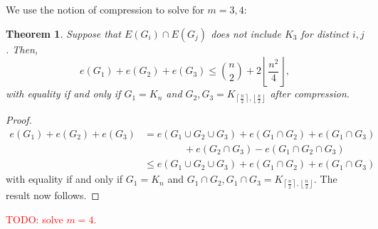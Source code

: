 \documentclass[a4paper]{article}
\newtheorem{theorem}{Theorem}[section]
\begin{document}
  We use the notion of compression to solve for $m = 3, 4$:
  \begin{theorem}
    Suppose that $E(G_i) \cap E(G_j)$ does not include $K_3$ for distinct $i, j$. Then,
    \[
      e(G_1) + e(G_2) + e(G_3) \leq \binom{n}{2} + 2\left\lfloor\frac{n^2}{4}\right\rfloor,
    \]
    with equality if and only if $G_1 = K_n$ and $G_2, G_3 = K_{\left\lceil\frac{n}{2}\right\rceil,
    \left\lfloor\frac{n}{2}\right\rfloor}$ after compression.
  \end{theorem}

  \begin{proof}
    \begin{align*}
      e(G_1) + e(G_2) + e(G_3) 
      &= e(G_1 \cup G_2 \cup G_3) + e(G_1 \cap G_2) + e(G_1 \cap G_3) \\
      &\qquad\qquad + e(G_2 \cap G_3) - e(G_1 \cap G_2 \cap G_3) \\
      &\leq e(G_1 \cup G_2 \cup G_3) + e(G_1 \cap G_2) + e(G_1 \cap G_3)
    \end{align*}
    with equality if and only if $G_1 = K_n$ and $G_1 \cap G_2, G_1 \cap G_3 =
    K_{\left\lceil\frac{n}{2}\right\rceil, \left\lfloor\frac{n}{2}\right\rfloor}$. The result now
    follows.
  \end{proof}

  \textcolor{red}{TODO: solve $m = 4$.}


\end{document}
